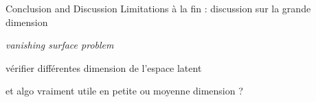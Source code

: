 \begin{frame}{Conclusion and Discussion}
    Limitations à la fin : discussion sur la grande dimension
  
    \textit{vanishing surface problem} 
  
    vérifier différentes dimension de l'espace latent 
  
    et algo vraiment utile en petite ou moyenne dimension ?
  
  \end{frame}